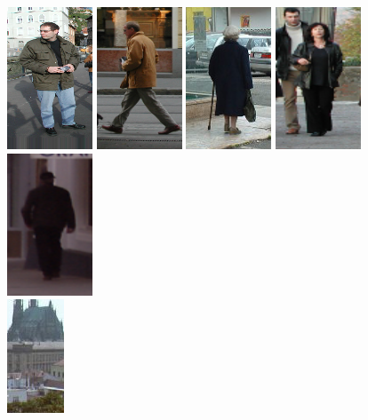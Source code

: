 \begin{figure}[htc]
  \centering
  \includegraphics[scale=.6]{images/train1}
  \includegraphics[scale=.6]{images/train2}
  \includegraphics[scale=.6]{images/train3}
  \includegraphics[scale=.6]{images/train4}
  \includegraphics[scale=.6]{images/train5}\\
  \includegraphics[scale=.9]{images/neg1}

\end{figure}
